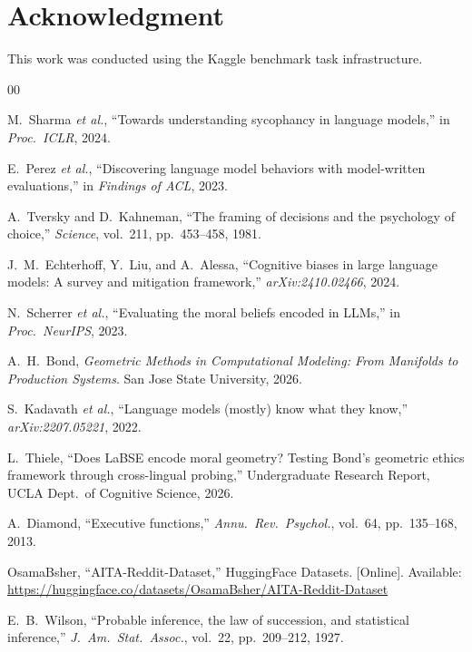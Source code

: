 \documentclass[conference]{IEEEtran}
\begin{document}
\section*{Acknowledgment}

This work was conducted using the Kaggle benchmark task infrastructure.

\begin{thebibliography}{00}

M.~Sharma \emph{et al.}, ``Towards understanding sycophancy in language models,'' in \emph{Proc.\ ICLR}, 2024.

E.~Perez \emph{et al.}, ``Discovering language model behaviors with model-written evaluations,'' in \emph{Findings of ACL}, 2023.

A.~Tversky and D.~Kahneman, ``The framing of decisions and the psychology of choice,'' \emph{Science}, vol.~211, pp.~453--458, 1981.

J.~M.~Echterhoff, Y.~Liu, and A.~Alessa, ``Cognitive biases in large language models: A survey and mitigation framework,'' \emph{arXiv:2410.02466}, 2024.

N.~Scherrer \emph{et al.}, ``Evaluating the moral beliefs encoded in LLMs,'' in \emph{Proc.\ NeurIPS}, 2023.

A.~H.~Bond, \emph{Geometric Methods in Computational Modeling: From Manifolds to Production Systems}. San Jose State University, 2026.

S.~Kadavath \emph{et al.}, ``Language models (mostly) know what they know,'' \emph{arXiv:2207.05221}, 2022.

L.~Thiele, ``Does LaBSE encode moral geometry? Testing Bond's geometric ethics framework through cross-lingual probing,'' Undergraduate Research Report, UCLA Dept.\ of Cognitive Science, 2026.

A.~Diamond, ``Executive functions,'' \emph{Annu.\ Rev.\ Psychol.}, vol.~64, pp.~135--168, 2013.

OsamaBsher, ``AITA-Reddit-Dataset,'' HuggingFace Datasets. [Online]. Available: \url{https://huggingface.co/datasets/OsamaBsher/AITA-Reddit-Dataset}

E.~B.~Wilson, ``Probable inference, the law of succession, and statistical inference,'' \emph{J.\ Am.\ Stat.\ Assoc.}, vol.~22, pp.~209--212, 1927.


\end{thebibliography}
\end{document}
